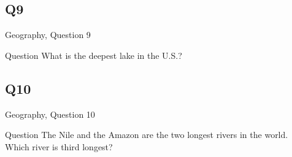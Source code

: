 \documentclass[11pt]{beamer}
\begin{document}
\subsection*{Q9}
\begin{frame}[t]{Geography, Question 9}
\begin{block}{Question}
What is the deepest lake in the U.S.?
\end{block}
\end{frame}
\subsection*{Q10}
\begin{frame}[t]{Geography, Question 10}
\begin{block}{Question}
The Nile and the Amazon are the two longest rivers in the world. Which river is third longest?
\end{block}
\end{frame}
\end{document}

